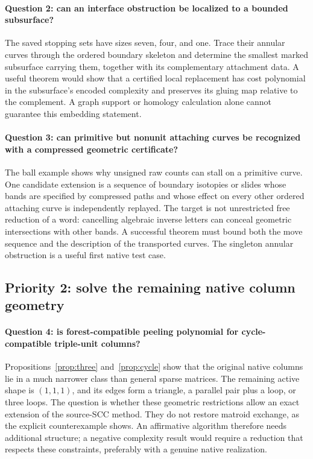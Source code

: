 \paragraph{Question 2: can an interface obstruction be localized to a
bounded subsurface?}
The saved stopping sets have sizes seven, four, and one.  Trace their
annular curves through the ordered boundary skeleton and determine the
smallest marked subsurface carrying them, together with its complementary
attachment data.  A useful theorem would show that a certified local
replacement has cost polynomial in the subsurface's encoded complexity
and preserves its gluing map relative to the complement.  A graph support
or homology calculation alone cannot guarantee this embedding statement.

\paragraph{Question 3: can primitive but nonunit attaching curves be
recognized with a compressed geometric certificate?}
The ball example shows why unsigned raw counts can stall on a primitive
curve.  One candidate extension is a sequence of boundary isotopies or
slides whose bands are specified by compressed paths and whose effect
on every other ordered attaching curve is independently replayed.
The target is not unrestricted free reduction of a word: cancelling
algebraic inverse letters can conceal geometric intersections with other
bands.  A successful theorem must bound both the move sequence and the
description of the transported curves.  The singleton annular obstruction
is a useful first native test case.

\subsection{Priority 2: solve the remaining native column geometry}
\paragraph{Question 4: is forest-compatible peeling polynomial for
cycle-compatible triple-unit columns?}
Propositions~\ref{prop:three} and~\ref{prop:cycle} show that the original
native columns lie in a much narrower class than general sparse matrices.
The remaining active shape is $(1,1,1)$, and its edges form a triangle,
a parallel pair plus a loop, or three loops.  The question is whether
these geometric restrictions allow an exact extension of the source-SCC
method.  They do not restore matroid exchange, as the explicit counterexample
shows.  An affirmative algorithm therefore needs additional structure;
a negative complexity result would require a reduction that respects
these constraints, preferably with a genuine native realization.

